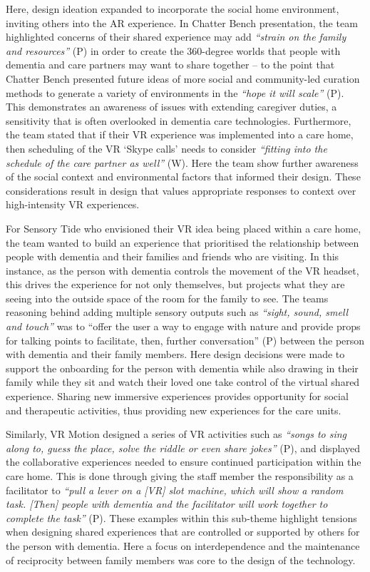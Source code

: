 Here, design ideation expanded to incorporate the social home environment, inviting others into the AR experience. In Chatter Bench presentation, the team highlighted concerns of their shared experience may add \textit{``strain on the family and resources''} (P) in order to create the 360-degree worlds that people with dementia and care partners may want to share together – to the point that Chatter Bench presented future ideas of more social and community-led curation methods to generate a variety of environments in the \textit{``hope it will scale''} (P). This demonstrates an awareness of issues with extending caregiver duties, a sensitivity that is often overlooked in dementia care technologies. Furthermore, the team stated that if their VR experience was implemented into a care home, then scheduling of the VR `Skype calls' needs to consider \textit{``fitting into the schedule of the care partner as well''} (W). Here the team show further awareness of the social context and environmental factors that informed their design. These considerations result in design that values appropriate responses to context over high-intensity VR experiences. 

For Sensory Tide who envisioned their VR idea being placed within a care home, the team wanted to build an experience that prioritised the relationship between people with dementia and their families and friends who are visiting. In this instance, as the person with dementia controls the movement of the VR headset, this drives the experience for not only themselves, but projects what they are seeing into the outside space of the room for the family to see. The teams reasoning behind adding multiple sensory outputs such as \textit{``sight, sound, smell and touch''} was to “offer the user a way to engage with nature and provide props for talking points to facilitate, then, further conversation” (P) between the person with dementia and their family members. Here design decisions were made to support the onboarding for the person with dementia while also drawing in their family while they sit and watch their loved one take control of the virtual shared experience. Sharing new immersive experiences provides opportunity for social and therapeutic activities, thus providing new experiences for the care units.

Similarly, VR Motion designed a series of VR activities such as \textit{``songs to sing along to, guess the place, solve the riddle or even share jokes''} (P), and displayed the collaborative experiences needed to ensure continued participation within the care home. This is done through giving the staff member the responsibility as a facilitator to \textit{``pull a lever on a [VR] slot machine, which will show a random task. [Then] people with dementia and the facilitator will work together to complete the task''} (P). These examples within this sub-theme highlight tensions when designing shared experiences that are controlled or supported by others for the person with dementia. Here a focus on interdependence and the maintenance of reciprocity between family members was core to the design of the technology.

